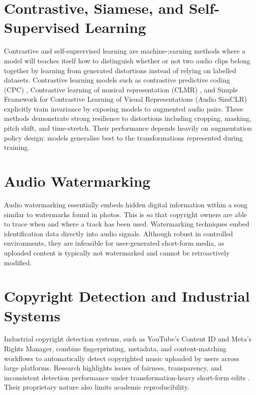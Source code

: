 \documentclass[../Thesis]{subfiles}
\begin{document}
\section{Contrastive, Siamese, and Self-Supervised Learning} \label{CSSL}
Contrastive and self-suprervised learning are machine-;earning methods where a model will teaches itself how to distinguish whether or not two audio clips belong together by learning from generated distortions instead of relying on labelled datasets. Contrastive learning models such as contrastive predictive coding (CPC) \parencite{oord2018cpc}, Contrastive learning of musical representation (CLMR) \parencite{spijkervet2021clmr}, and Simple Framework for Contrastive Learning of Visual Representations (Audio SimCLR) \parencite{jansen2020unsupervised} explicitly train invariance by exposing models to augmented audio pairs. These methods demonstrate strong resilience to distortions including cropping, masking, pitch shift, and time-stretch. Their performance depends heavily on augmentation policy design: models generalise best to the transformations represented during training.

\section{Audio Watermarking} \label{audio watermarking}
Audio watermarking essentially embeds hidden digital information within a song similar to watermarks found in photos. This is so that copyright owners are able to trace when and where a track has been used. Watermarking techniques \parencite{cox2002digital,kirovski2003spread,subramanyam2007review} embed identification data directly into audio signals. Although robust in controlled environments, they are infeasible for user-generated short-form media, as uploaded content is typically not watermarked and cannot be retroactively modified.

\section{Copyright Detection and Industrial Systems} \label{copyright detection}
Industrial copyright detection systems, such as YouTube’s Content ID \parencite{rafiei2019contentid} and Meta’s Rights Manager, combine fingerprinting, metadata, and content-matching workflows to automatically detect copyrighted music uploaded by users across large platforms. Research highlights issues of fairness, transparency, and inconsistent detection performance under transformation-heavy short-form edits \parencite{mayer2020policy}. Their proprietary nature also limits academic reproducibility.
\end{document}
